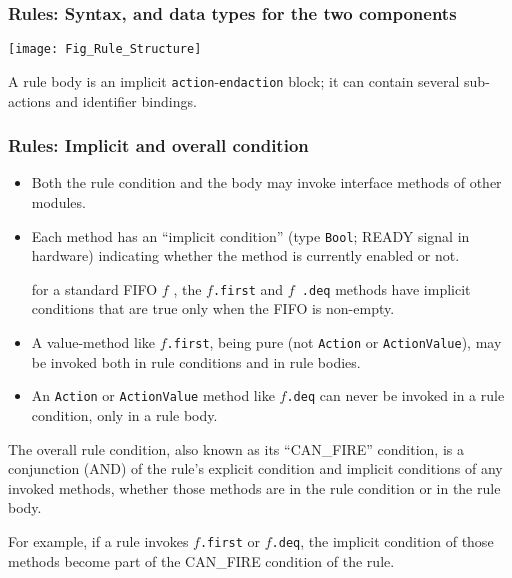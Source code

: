 
\begin{frame}[fragile]
\frametitle{Rules: Syntax, and data types for the two components}

\footnotesize

\begin{center}
 \texttt{[image: Fig\_Rule\_Structure]}
\end{center}

\vspace{5ex}

A rule body is an implicit {\tt action}-{\tt endaction} block; it can
contain several sub-actions and identifier bindings.

\vspace{1ex}

\end{frame}


\begin{frame}[fragile]
\frametitle{Rules: Implicit and overall condition}

\footnotesize

\begin{itemize}

\item Both the rule condition and the body may invoke interface methods of
      other modules.

\item Each method has an ``implicit condition'' (type {\tt Bool}; READY signal in hardware)
      indicating whether the method is currently enabled or not.

      {\Eg} for a standard FIFO $f$ , the $f${\tt .first} and $f${\tt
      .deq} methods have implicit conditions that are true only when
      the FIFO is non-empty.

\item A value-method like $f${\tt .first}, being
      pure (not {\tt Action} or {\tt ActionValue}), may be invoked
      both in rule conditions and in rule bodies.

\item An {\tt Action} or {\tt ActionValue}  method like $f${\tt .deq} can
      never be invoked in a rule condition, only in a rule body.

\end{itemize}

\vspace{5ex}

The overall rule condition, also known as its ``CAN\_FIRE'' condition,
is a conjunction (AND) of the rule’s explicit condition and implicit
conditions of any invoked methods, whether those methods are in the
rule condition or in the rule body.

\vspace{1ex}

For example, if a rule invokes $f${\tt .first} or $f${\tt .deq}, the
implicit condition of those methods become part of the CAN\_FIRE
condition of the rule.

\end{frame}

